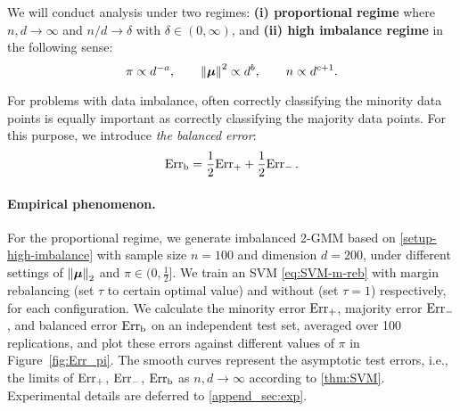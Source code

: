 We will conduct analysis under two regimes: \textbf{(i) proportional regime} where $n,d \to \infty$ and $n/d \to \delta$ with $\delta \in (0,\infty)$, and \textbf{(ii) high imbalance regime} in the following sense:
\begin{equation}\label{setup-high-imbalance}
\pi \propto d^{-a}, \qquad \left\|{{\boldsymbol{\mu}}}\right\|^2 \propto d^b, \qquad n \propto d^{c+1}.
\end{equation}

For problems with data imbalance, often correctly classifying the minority data points is equally important as correctly classifying the majority data points. 
For this purpose, we introduce \textit{the balanced error}: 
\begin{equation}\label{eq:balanced_err}
\mathrm{Err}_\mathrm{b} = \frac{1}{2} \mathrm{Err}_+ + \frac{1}{2} \mathrm{Err}_-\, .
\end{equation}

\paragraph{Empirical phenomenon.} For the  proportional regime, we generate imbalanced 2-GMM based on \cref{setup-high-imbalance} with sample size $n = 100$ and dimension $d = 200$, under different settings of $\left\|{\text{\boldmath $\mu$}}\right\|_2$ and $\pi \in (0, \frac12]$. We train an SVM \cref{eq:SVM-m-reb} with margin rebalancing (set $\tau$ to certain optimal value) and without (set $\tau = 1$) respectively, for each configuration. We calculate the minority error $\mathrm{Err}_+$, majority error $\mathrm{Err}_-$, and balanced error $\mathrm{Err}_\mathrm{b}$ on an independent test set, averaged over 100 replications, and plot these errors against different values of $\pi$ in Figure~\ref{fig:Err_pi}. The smooth curves represent the asymptotic test errors, i.e., the limits of $\mathrm{Err}_+$, $\mathrm{Err}_-$, $\mathrm{Err}_\mathrm{b}$ as $n, d \to \infty$ according to \cref{thm:SVM}. Experimental  details are deferred to \cref{append_sec:exp}. 




